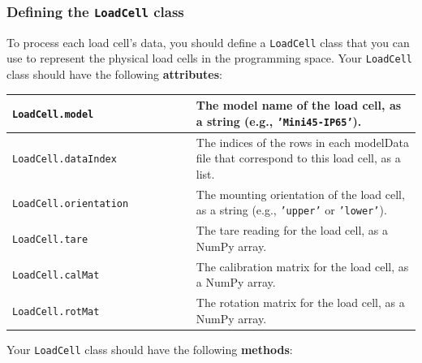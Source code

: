 \documentclass{homework}
\begin{document}
\newpage
\subsubsection*{Defining the \texttt{LoadCell} class}

To process each load cell's data, you should define a \texttt{LoadCell} class that you can use to represent the physical load cells in the programming space. Your \texttt{LoadCell} class should have the following \textbf{attributes}:

\begin{tabular}{p{0.45\linewidth} | p{0.6\linewidth}} 
    \hline
    \texttt{LoadCell.model} & The model name of the load cell, as a string (e.g., \texttt{'Mini45-IP65'}). \\ \hline
    \texttt{LoadCell.dataIndex} & The indices of the rows in each modelData file that correspond to this load cell, as a list.  \\ \hline
    \texttt{LoadCell.orientation} & The mounting orientation of the load cell, as a string (e.g., \texttt{'upper'} or \texttt{'lower'}). \\ \hline
    \texttt{LoadCell.tare} & The tare reading for the load cell, as a NumPy array. \\ \hline
    \texttt{LoadCell.calMat} & The calibration matrix for the load cell, as a NumPy array. \\ \hline
    \texttt{LoadCell.rotMat} & The rotation matrix for the load cell, as a NumPy array. \\ \hline

\end{tabular}

Your \texttt{LoadCell} class should have the following \textbf{methods}:
\end{document}
